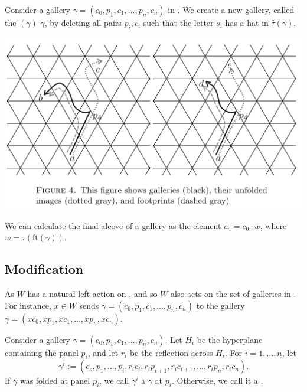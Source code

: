 \documentclass[12pt]{article}
\begin{document}
\begin{definition}
    Consider a gallery $\gamma = (c_0,p_1,c_1,...,p_n,c_n)$ in \sg. We create a new gallery, called the  $(\gamma)$  $\gamma$, by deleting all pairs $p_i,c_i$ such that the letter $s_i$ has a hat in $\hat{\tau}(\gamma)$. 

\end{definition}

\includegraphics[scale=0.6]{Screenshot 2023-02-03 133522.png}\\

\begin{lemma}
    We can calculate the final alcove of a gallery as the element $c_n=c_0\cdot w$, where $w=\tau(\text{ft}(\gamma))$.
\end{lemma}

\subsection{Modification}

As $W$ has a natural left action on \sg, and so $W$ also acts on the set of galleries in \sg. For instance, $x\in W$ sends $\gamma = (c_0,p_1,c_1,...,p_n,c_n)$ to the gallery $\gamma = (xc_0,xp_1,xc_1,...,xp_n,xc_n)$. 

\begin{lemma}
    
\end{lemma}


\begin{definition}
    Consider a gallery $\gamma = (c_0,p_1,c_1,...,p_n,c_n)$. Let $H_i$ be the hyperplane containing the panel $p_i$, and let $r_i$ be the reflection across $H_i$. For $i=1,...,n$, let
    \[\gamma^i:=(c_o,p_1,...,p_i,r_ic_i,r_ip_{i+1},r_ic_{i+1},...,r_ip_n,r_ic_n).\]
    If $\gamma$ was folded at panel $p_i$, we call $\gamma^i$ a $\gamma$ at $p_i$. Otherwise, we call it a .
\end{definition}
\end{document}
